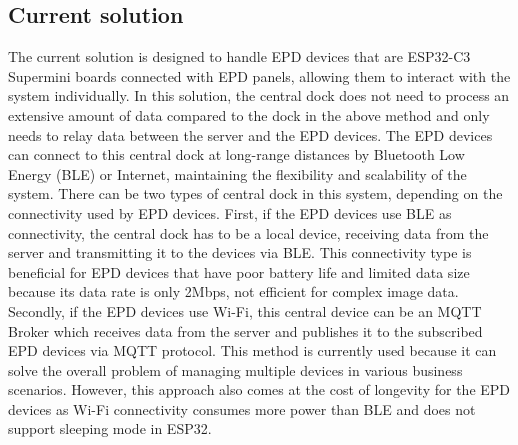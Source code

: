 \documentclass[../Main.tex]{subfiles}
\begin{document}
\subsection{Current solution}
The current solution is designed to handle EPD devices that are ESP32-C3 Supermini boards connected with EPD panels, allowing them to interact with the system individually. In this solution, the central dock does not need to process an extensive amount of data compared to the dock in the above method and only needs to relay data between the server and the EPD devices. The EPD devices can connect to this central dock at long-range distances by Bluetooth Low Energy (BLE) or Internet, maintaining the flexibility and scalability of the system. There can be two types of central dock in this system, depending on the connectivity used by EPD devices. First, if the EPD devices use BLE as connectivity, the central dock has to be a local device, receiving data from the server and transmitting it to the devices via BLE. This connectivity type is beneficial for EPD devices that have poor battery life and limited data size because its data rate is only 2Mbps, not efficient for complex image data. Secondly, if the EPD devices use Wi-Fi, this central device can be an MQTT Broker which receives data from the server and publishes it to the subscribed EPD devices via MQTT protocol. This method is currently used because it can solve the overall problem of managing multiple devices in various business scenarios. However, this approach also comes at the cost of longevity for the EPD devices as Wi-Fi connectivity consumes more power than BLE and does not support sleeping mode in ESP32.
\end{document}
